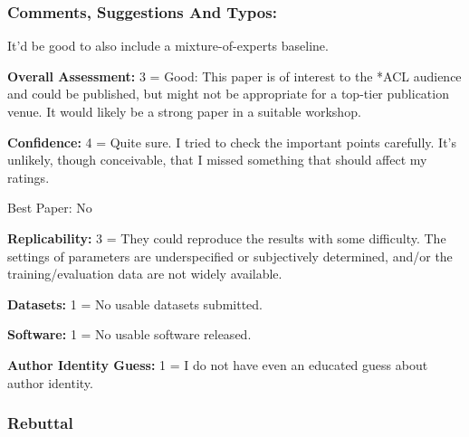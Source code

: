 \documentclass[12pt,times,a4paper,twoside]{article}
\theoremstyle{definition}
\begin{document}
\subsubsection*{Comments, Suggestions And Typos:}
It'd be good to also include a mixture-of-experts baseline.


\textbf{Overall Assessment:} 3 = Good: This paper is of interest to the *ACL audience and could be published, but might not be appropriate for a top-tier publication venue. It would likely be a strong paper in a suitable workshop.

\textbf{Confidence:} 4 = Quite sure. I tried to check the important points carefully. It's unlikely, though conceivable, that I missed something that should affect my ratings.

Best Paper: No

\textbf{Replicability:} 3 = They could reproduce the results with some difficulty. The settings of parameters are underspecified or subjectively determined, and/or the training/evaluation data are not widely available.

\textbf{Datasets:} 1 = No usable datasets submitted.

\textbf{Software:} 1 = No usable software released.

\textbf{Author Identity Guess:} 1 = I do not have even an educated guess about author identity.

\subsubsection*{Rebuttal}
\end{document}
